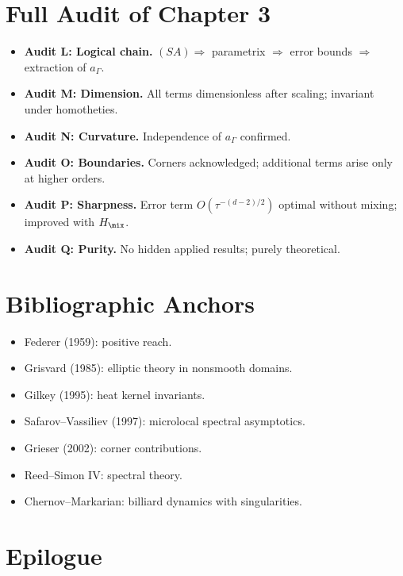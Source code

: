 \section{Full Audit of Chapter 3}
\label{sec:audit-ch3}

\begin{itemize}
  \item \textbf{Audit L: Logical chain.} $(SA)\Rightarrow$ parametrix $\Rightarrow$ error bounds $\Rightarrow$ extraction of $a_\Gamma$.
  \item \textbf{Audit M: Dimension.} All terms dimensionless after scaling; invariant under homotheties.
  \item \textbf{Audit N: Curvature.} Independence of $a_\Gamma$ confirmed.
  \item \textbf{Audit O: Boundaries.} Corners acknowledged; additional terms arise only at higher orders.
  \item \textbf{Audit P: Sharpness.} Error term $O(\tau^{-(d-2)/2})$ optimal without mixing; improved with $H_{\mix}$.
  \item \textbf{Audit Q: Purity.} No hidden applied results; purely theoretical.
\end{itemize}

\section{Bibliographic Anchors}
\label{sec:biblio}

\begin{itemize}
\item Federer (1959): positive reach.
\item Grisvard (1985): elliptic theory in nonsmooth domains.
\item Gilkey (1995): heat kernel invariants.
\item Safarov--Vassiliev (1997): microlocal spectral asymptotics.
\item Grieser (2002): corner contributions.
\item Reed--Simon IV: spectral theory.
\item Chernov--Markarian: billiard dynamics with singularities.
\end{itemize}

\section{Epilogue}
\label{sec:epilogue}


